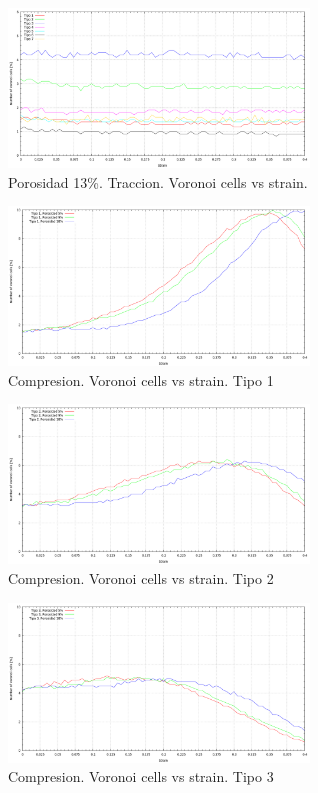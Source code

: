 \documentclass[10pt, oneside]{article} %
\begin{document}
\begin{figure}[H]
\centering
\includegraphics[width=8cm]{Figures/Porosidad/Porosidad_13_noVoronoi_strain_trac.png}
\caption{Porosidad 13\%. Traccion. Voronoi cells vs strain.}
\end{figure}

\begin{figure}[H]
\centering
\includegraphics[width=8cm]{Figures/Porosidad/Porosidad_noVoronoi_strain_tipo1_comp.png}
\caption{Compresion. Voronoi cells vs strain. Tipo 1}
\end{figure}

\begin{figure}[H]
\centering
\includegraphics[width=8cm]{Figures/Porosidad/Porosidad_noVoronoi_strain_tipo2_comp.png}
\caption{Compresion. Voronoi cells vs strain. Tipo 2}
\end{figure}

\begin{figure}[H]
\centering
\includegraphics[width=8cm]{Figures/Porosidad/Porosidad_noVoronoi_strain_tipo3_comp.png}
\caption{Compresion. Voronoi cells vs strain. Tipo 3}
\end{figure}
\end{document}
